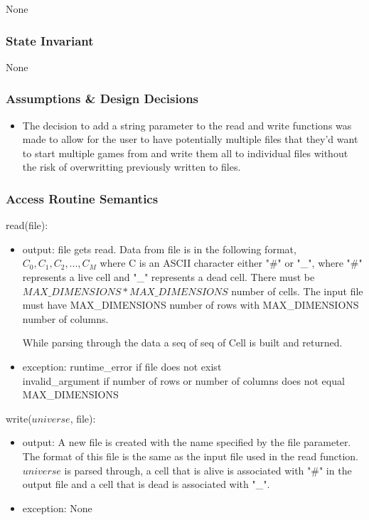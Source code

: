 \documentclass[12pt]{article}
\begin{document}
None

\subsubsection* {State Invariant}

None

\subsubsection* {Assumptions \& Design Decisions}

\begin{itemize}
\item The decision to add a string parameter to the read and write functions was made
  to allow for the user to have potentially multiple files that they'd want to 
  start multiple games from and write them all to individual files without the risk
  of overwritting previously written to files.
\end{itemize}

\subsubsection* {Access Routine Semantics}

read(file):
\begin{itemize}
\item output: file gets read. Data from file is in the following format, 
$C_0, C_1, C_2, ..., C_M$ where C is an ASCII character either "\#" or "\_",
where "\#" represents a live cell and "\_" represents a dead cell. 
There must be $MAX\_DIMENSIONS * MAX\_DIMENSIONS$ number of cells. 
The input file must have MAX\_DIMENSIONS number of rows with MAX\_DIMENSIONS number of columns.

While parsing through the data a seq of seq of Cell is built and returned.
  

\item exception: runtime\_error if file does not exist \\
				 invalid\_argument if number of rows or number of columns does not equal MAX\_DIMENSIONS
\end{itemize}

\noindent write($universe$, file):
\begin{itemize}
\item output: A new file is created with the name specified by the file parameter. The format of this file
is the same as the input file used in the read function. $universe$ is parsed through, a cell that is alive
is associated with "\#" in the output file and a cell that is dead is associated with "\_". 
\item exception: None
\end{itemize}
\end{document}
